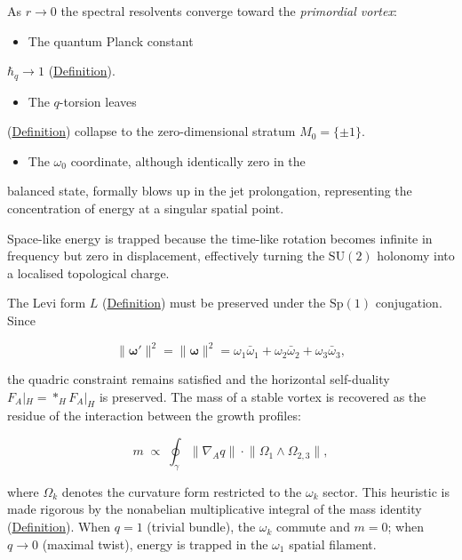 \begin{remark}
  \label{rem:primordial-vortex}
As $r\to 0$ the spectral resolvents converge toward the
\emph{primordial vortex}:

\begin{itemize}
  \item The quantum Planck constant
\end{itemize}
  $\hbar_q\to 1$ (\hyperref[def:quantum-planck-constant]{Definition}).
\begin{itemize}
  \item The $q$-torsion leaves
\end{itemize}
  (\hyperref[def:q-torsion-leaf]{Definition}) collapse to the zero-dimensional
  stratum $M_0=\{\pm 1\}$.
\begin{itemize}
  \item The $\omega_0$ coordinate, although identically zero in the
\end{itemize}
  balanced state, formally blows up in the jet prolongation, representing
  the concentration of energy at a singular spatial point.

Space-like energy is trapped because the time-like rotation becomes infinite
in frequency but zero in displacement, effectively turning the
$\mathrm{SU}(2)$ holonomy into a localised topological charge.
\end{remark}

\begin{remark}
  \label{rem:geometric-drag}
The Levi form $L$ (\hyperref[def:substrate-parameter]{Definition}) must be
preserved under the $\mathrm{Sp}(1)$ conjugation.  Since

\[
\lVert\boldsymbol{\omega}'\rVert^2
  =\lVert\boldsymbol{\omega}\rVert^2
  =\omega_1\bar{\omega}_1+\omega_2\bar{\omega}_2+\omega_3\bar{\omega}_3,
\]

the quadric constraint remains satisfied and
the horizontal self-duality $F_A|_H={*_H}F_A|_H$ is preserved.  The mass of a stable vortex is
recovered as the residue of the interaction between the growth profiles:

\begin{equation}\label{eq:mass-residue}
  m \;\propto\;
  \oint_{\gamma}
  \lVert\nabla_A q\rVert\cdot
  \lVert\Omega_1\wedge\Omega_{2,3}\rVert,
\end{equation}

where $\Omega_k$ denotes the curvature form restricted to the $\omega_k$
sector.  This heuristic is made rigorous by the nonabelian multiplicative
integral of the mass identity (\hyperref[def:mass-identity]{Definition}).
When $q=1$ (trivial bundle), the $\omega_k$ commute and $m=0$;
when $q\to 0$ (maximal twist), energy is trapped in the $\omega_1$ spatial
filament.
\end{remark}

